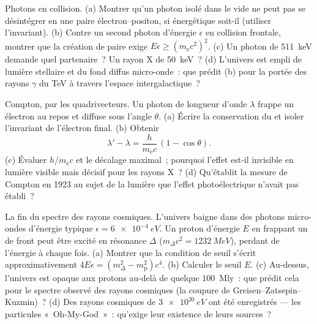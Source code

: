 \begin{exercise}[$\star\star$]\label{exo:b3:relativistic-dynamics:9}
Photons en collision. (a) Montrer qu'un photon isolé dans le vide ne
peut pas se désintégrer en une paire électron--positon, si énergétique
soit-il (utiliser l'invariant). (b) Contre un second photon d'énergie
$\epsilon$ en collision frontale, montrer que la création de paire
exige $E\epsilon \ge (m_{\text{e}}c^2)^2$. (c) Un photon de
\qty{511}{keV} demande quel partenaire~? Un rayon X de \qty{50}{keV}~?
(d) L'univers est empli de lumière stellaire et du fond diffus
micro-onde~: que prédit (b) pour la portée des rayons $\gamma$ du TeV à
travers l'espace intergalactique~?
\end{exercise}

\begin{exercise}[$\star\star\star$]\label{exo:b3:relativistic-dynamics:10}
Compton, par les quadrivecteurs. Un photon de longueur d'onde $\lambda$
frappe un électron au repos et diffuse sous l'angle $\theta$. (a)
Écrire la conservation du  et isoler
l'invariant de l'électron final. (b) Obtenir
\[
\lambda' - \lambda = \frac{h}{m_{\text{e}}c}\,(1 - \cos\theta) .
\]
(c) Évaluer $h/m_{\text{e}}c$ et le décalage maximal~; pourquoi l'effet
est-il invisible en lumière visible mais décisif pour les rayons X~?
(d) Qu'établit la mesure de Compton en 1923 au sujet de la lumière que
l'effet photoélectrique n'avait pas établi~?
\end{exercise}

\begin{exercise}[$\star\star\star$]\label{exo:b3:relativistic-dynamics:11}
La fin du spectre des rayons cosmiques. L'univers baigne dans des
photons micro-ondes d'énergie typique $\epsilon = \qty{6e-4}{eV}$. Un
proton d'énergie $E$ en frappant un de front peut être excité en
résonance $\Delta$ ($m_\Delta c^2 = \qty{1232}{MeV}$), perdant de
l'énergie à chaque fois. (a) Montrer que la condition de seuil s'écrit approximativement $4E\epsilon =
(m_\Delta^2 - m_{\text{p}}^2)c^4$. (b) Calculer le seuil $E$. (c)
Au-dessus, l'univers est opaque aux protons au-delà de quelque
\qty{100}{Mly}~: que prédit cela pour le spectre observé des rayons
cosmiques (la coupure de Greisen--Zatsepin--Kuzmin)~? (d) Des rayons
cosmiques de $\qty{3e20}{eV}$ ont été enregistrés --- les particules
«~Oh-My-God~»~: qu'exige leur existence de leurs sources~?
\end{exercise}

